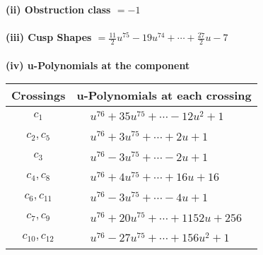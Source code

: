\documentclass[1p]{elsarticle_modified}
\theoremstyle{definition}
\begin{document}
\flushleft \textbf{(ii) Obstruction class $= -1$}\\~\\
\flushleft \textbf{(iii) Cusp Shapes $= \frac{11}{2} u^{75}-19 u^{74}+\cdots+\frac{27}{2} u-7$}\\~\\
\newpage\renewcommand{\arraystretch}{1}
\flushleft \textbf{(iv) u-Polynomials at the component}\newline \\
\begin{tabular}{m{50pt}|m{274pt}}
Crossings & \hspace{64pt}u-Polynomials at each crossing \\
\hline $$\begin{aligned}c_{1}\end{aligned}$$&$\begin{aligned}
&u^{76}+35 u^{75}+\cdots-12 u^2+1
\end{aligned}$\\
\hline $$\begin{aligned}c_{2},c_{5}\end{aligned}$$&$\begin{aligned}
&u^{76}+3 u^{75}+\cdots+2 u+1
\end{aligned}$\\
\hline $$\begin{aligned}c_{3}\end{aligned}$$&$\begin{aligned}
&u^{76}-3 u^{75}+\cdots-2 u+1
\end{aligned}$\\
\hline $$\begin{aligned}c_{4},c_{8}\end{aligned}$$&$\begin{aligned}
&u^{76}+4 u^{75}+\cdots+16 u+16
\end{aligned}$\\
\hline $$\begin{aligned}c_{6},c_{11}\end{aligned}$$&$\begin{aligned}
&u^{76}-3 u^{75}+\cdots-4 u+1
\end{aligned}$\\
\hline $$\begin{aligned}c_{7},c_{9}\end{aligned}$$&$\begin{aligned}
&u^{76}+20 u^{75}+\cdots+1152 u+256
\end{aligned}$\\
\hline $$\begin{aligned}c_{10},c_{12}\end{aligned}$$&$\begin{aligned}
&u^{76}-27 u^{75}+\cdots+156 u^2+1
\end{aligned}$\\
\hline
\end{tabular}\\~\\
\end{document}

